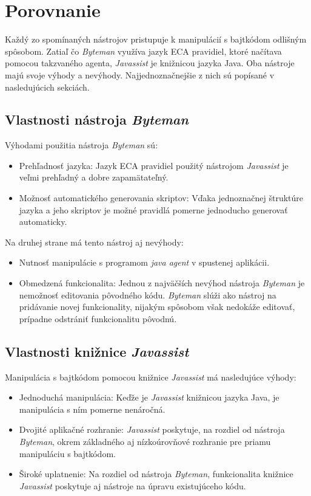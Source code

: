 \documentclass[11pt,final,oneside]{fithesis}
\begin{document}
\chapter{Porovnanie}

Každý zo spomínaných nástrojov pristupuje k manipulácií s bajtkódom odlišným 
spôsobom. Zatiaľ čo \textit{Byteman} využíva jazyk ECA pravidiel, ktoré 
načítava pomocou takzvaného agenta, \textit{Javassist} je knižnicou jazyka 
Java. Oba nástroje majú svoje výhody a nevýhody. Najjednoznačnejšie z nich sú 
popísané v nasledujúcich sekciách.

\section{Vlastnosti nástroja \textit{Byteman}}
Výhodami použitia nástroja \textit{Byteman} sú:

\begin{itemize}
\item Prehľadnosť jazyka: Jazyk ECA pravidiel použitý nástrojom 
\textit{Javassist} je veľmi prehľadný a dobre zapamätateľný. 
\item Možnosť automatického generovania skriptov: Vďaka jednoznačnej štruktúre 
jazyka a jeho skriptov je možné pravidlá pomerne jednoducho generovať 
automaticky.
\end{itemize}

Na druhej strane má tento nástroj aj nevýhody:

\begin{itemize}
\item Nutnosť manipulácie s programom \textit{java agent} v spustenej 
aplikácii.
\item Obmedzená funkcionalita: Jednou z najväčších nevýhod nástroja 
\textit{Byteman} je nemožnosť editovania pôvodného kódu. \textit{Byteman} slúži
ako nástroj na pridávanie novej funkcionality, nijakým spôsobom však nedokáže 
editovať, prípadne odstrániť funkcionalitu pôvodnú. 
\end{itemize}

\section{Vlastnosti knižnice \textit{Javassist}}
Manipulácia s bajtkódom pomocou knižnice \textit{Javassist} má nasledujúce 
výhody:

\begin{itemize}
\item Jednoduchá manipulácia: Keďže je \textit{Javassist} knižnicou jazyka 
Java, je manipulácia s ním pomerne nenáročná.
\item Dvojité aplikačné rozhranie: \textit{Javassist} poskytuje, na rozdiel od 
nástroja \textit{Byteman}, okrem základného aj nízkoúrovňové rozhranie pre 
priamu manipuláciu s bajtkódom.
\item Široké uplatnenie: Na rozdiel od nástroja \textit{Byteman}, funkcionalita
knižnice \textit{Javassist} poskytuje aj nástroje na úpravu existujúceho kódu.
\end{itemize}
\end{document}
